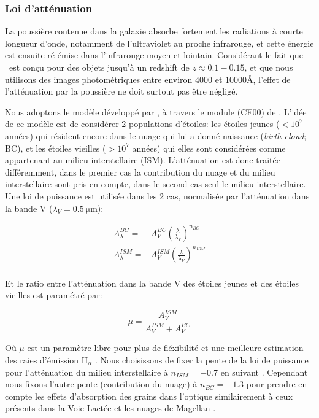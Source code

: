 \documentclass[../main/main.tex]{subfiles}
\begin{document}
\subsubsection{Loi d'atténuation}

La poussière contenue dans la galaxie absorbe fortement les radiations à courte longueur d'onde, notamment de l'ultraviolet au proche infrarouge, et cette énergie est ensuite ré-émise dans l'infrarouge moyen et lointain. Considérant le fait que \hypergal\ est conçu pour des objets jusqu'à un redshift de $z\approx0.1-0.15$, et que nous utilisons des images photométriques entre environ $4000$ et $10000$\AA, l'effet de l'atténuation par la poussière ne doit surtout pas être négligé.

Nous adoptons le modèle développé par \citet{CharlotFall2000}, à travers le module \textbf{} (CF00) de \cigale. L'idée de ce modèle est de considérer 2 populations d'étoiles: les étoiles jeunes ($<10^7$ années) qui résident encore dans le nuage qui lui a donné naissance (\textit{birth cloud}; BC), et les étoiles vieilles ($>10^7$ années) qui elles sont considérées comme appartenant au milieu interstellaire (ISM). L'atténuation est donc traitée différemment, dans le premier cas la contribution du nuage et du milieu interstellaire sont pris en compte, dans le second cas seul le milieu interstellaire. Une loi de puissance est utilisée dans les 2 cas, normalisée par l'atténuation dans la bande V ($\lambda_V=\SI{0.5}{\micro\metre}$):

\begin{align*}
  A_{\lambda}^{BC}=&A_{V}^{BC}\left(\frac{\lambda}{\lambda_V}\right)^{n_{BC}}\\
  A_{\lambda}^{ISM}=&A_{V}^{ISM}\left(\frac{\lambda}{\lambda_V}\right)^{n_{ISM}}
\end{align*}\\

Et le ratio entre l'atténuation dans la bande V des étoiles jeunes et des étoiles vieilles est paramétré par:

\begin{equation*}
  \mu=\frac{A_{V}^{ISM}}{A_{V}^{ISM}+A_{V}^{BC}}
\end{equation*}

Où $\mu$ est un paramètre libre pour plus de fléxibilité et une
meilleure estimation des raies d'émission $\text{H}_{\alpha}$
\citep{Battisti2016,Buat2018,Malek2018,Chevallard2019}.
Nous choisissons de fixer la pente de la loi de puissance pour l'atténuation du milieu interstellaire à $n_{ISM}=-0.7$ en suivant \citet{CharlotFall2000}. Cependant nous fixons l'autre pente (contribution du nuage) à $n_{BC}=-1.3$ pour prendre en compte les effets d'absorption des grains dans l'optique similairement à ceux présents dans la Voie Lactée et les nuages de Magellan \citep{LoFaro2017,Wild2007,Cunha2008MAGPHYS,Battisti2019}.
\end{document}
